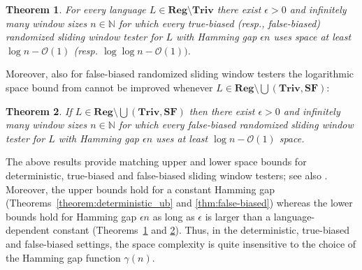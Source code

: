 \documentclass{article}\usepackage[a4paper,margin=20mm]{geometry}
\newtheorem{theorem}{Theorem}\newtheorem{lemma}[theorem]{Lemma}\newtheorem{proposition}[theorem]{Proposition}\newtheorem{corollary}[theorem]{Corollary}\newtheorem{definition}[theorem]{Definition}\newtheorem{claim}[theorem]{Claim}\newtheorem{remark}[theorem]{Remark}\newtheorem{observation}[theorem]{Observation}\newtheorem{conjecture}[theorem]{Conjecture}\newtheorem{example}[theorem]{Example}
\newcommand{\N}{\mathbb{N}}
\renewcommand{\O}{\mathcal{O}}
\newcommand{\Reg}{\mathbf{Reg}}
\newcommand{\Triv}{\mathbf{Triv}}
\newcommand{\SF}{\mathbf{SF}}
\begin{document}
\begin{theorem}
\label{theorem:deterministic_lb}
For every language $L \in \Reg \setminus \Triv$ there exist $\epsilon > 0$ and infinitely many window sizes $n \in \N$
for which every  true-biased (resp., false-biased) randomized sliding window tester for $L$ with Hamming gap $\epsilon n$
uses space at least $\log n - \O(1)$ (resp. $\log \log n - \O(1))$.
\end{theorem}
Moreover, also for false-biased randomized sliding window testers the 
 logarithmic space bound from  cannot be improved
whenever $L \in \Reg \setminus  \bigcup(\Triv, \SF)$:

\begin{theorem}
\label{thm:lb-false-biased}
If $L \in \Reg \setminus  \bigcup(\Triv, \SF)$ then there exist $\epsilon > 0$ and infinitely many window sizes $n \in \N$
for which every false-biased randomized sliding window tester for $L$ with Hamming gap $\epsilon n$
uses at least $\log n - \O(1)$ space. 
\end{theorem}
The above results provide matching upper and lower space bounds for deterministic, true-biased and false-biased sliding window testers; see also .
Moreover, the upper bounds hold for a constant Hamming gap (Theorems~\ref{theorem:deterministic_ub} and \ref{thm:false-biased}) 
whereas the lower bounds hold for Hamming gap $\epsilon n$ as long as $\epsilon$ is larger than a language-dependent constant (Theorems~\ref{theorem:deterministic_lb} and \ref{thm:lb-false-biased}).
Thus, in the deterministic, true-biased and false-biased settings, the space complexity is quite insensitive to the choice of the Hamming gap function $\gamma(n)$. 
\end{document}
